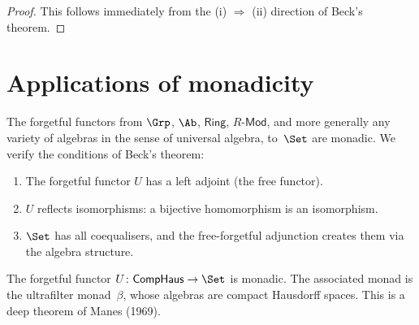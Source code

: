 \begin{proof}
This follows immediately from the (i) $\Rightarrow$ (ii) direction
of Beck's theorem.
\end{proof}


\section{Applications of monadicity}\label{sec:monadicity-apps}

\begin{example}%
\label{ex:monadic-algebraic}
The forgetful functors from $\Grp$, $\Ab$, $\mathsf{Ring}$,
$R\text{-}\mathsf{Mod}$, and more generally any variety of
algebras in the sense of universal algebra, to~$\Set$ are monadic.
We verify the conditions of Beck's theorem:
\begin{enumerate}[label=(\alph*)]
\item The forgetful functor $U$ has a left adjoint (the free functor).
\item $U$ reflects isomorphisms: a bijective homomorphism is an
    isomorphism.
\item $\Set$ has all coequalisers, and the free-forgetful adjunction
    creates them via the algebra structure.
\end{enumerate}
\end{example}

\begin{example}\label{ex:monadic-comphaus}
The forgetful functor $U\colon\mathsf{CompHaus}\to\Set$ is monadic.
The associated monad is the ultrafilter monad~$\beta$, whose
algebras are compact Hausdorff spaces.  This is a deep theorem of
Manes (1969).
\end{example}

